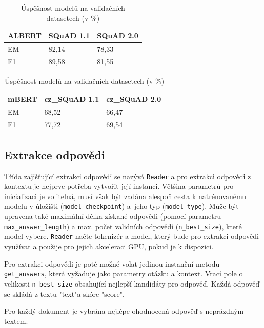 \begin{table}[hbt]
\centering
    \begin{tabular}{| l | l | l |}
        \hline
        \textbf{ALBERT} & SQuAD 1.1 & SQuAD 2.0 \\ \hline
        EM              & 82,14      & 78,33      \\ \hline
        F1              & 89,58      & 81,55      \\ \hline
    \end{tabular}
    \begin{tabular}{| l | l | l |}
        \hline
        \textbf{mBERT} & cz\_SQuAD 1.1 & cz\_SQuAD 2.0 \\ \hline
        EM              & 68,52      & 66,47      \\ \hline
        F1              & 77,72      & 69,54      \\ \hline
    \end{tabular}
    \caption{
    Úspěšnost modelů na validačních datasetech (v \%)
    }
    \label{tab:reader_trained}
\end{table}

\subsection{Extrakce odpovědi}
Třída zajišťující extrakci odpovědi se nazývá \texttt{Reader} a pro extrakci odpovědi z kontextu je nejprve potřeba vytvořit její instanci. Většina parametrů pro inicializaci je volitelná, musí však být zadána alespoň cesta k natrénovanému modelu v úložišti (\texttt{model\_checkpoint}) a~jeho typ (\texttt{model\_type}). Může být upravena také maximální délka získané odpovědi (pomocí parametru\texttt{ max\_answer\_length}) a max. počet validních odpovědí (\texttt{n\_best\_size}), které model vybere. \texttt{Reader} načte tokenizér a model, který bude pro extrakci odpovědi využívat a použije pro jejich akceleraci GPU, pokud je k dispozici.\par
Pro extrakci odpovědi je poté možné volat jedinou instanční metodu \texttt{get\_answers}, která vyžaduje jako parametry otázku a kontext. Vrací pole o velikosti \texttt{n\_best\_size} obsahující nejlepší kandidáty pro odpověď. Každá odpověď se skládá z textu "text"\;a skóre "score".\par
Pro každý dokument je vybrána nejlépe ohodnocená odpověď s neprázdným textem.

